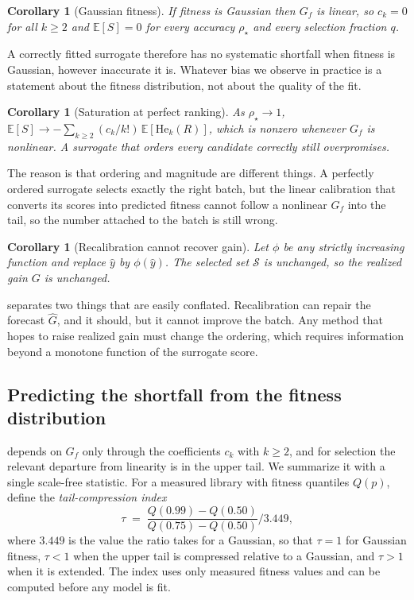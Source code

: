 \documentclass{article}
\theoremstyle{plain}
\newtheorem{corollary}[theorem]{Corollary}
\theoremstyle{definition}
\newcommand{\yhat}{\hat{y}}
\newcommand{\Exp}{\mathbb{E}}
\newcommand{\He}{\mathrm{He}}
\begin{document}
\begin{corollary}[Gaussian fitness]
\label{cor:gaussian}
If fitness is Gaussian then $G_{\!f}$ is linear, so $c_k = 0$ for all $k \ge 2$ and
$\Exp[S] = 0$ for every accuracy $\rho_\star$ and every selection fraction $q$.
\end{corollary}

A correctly fitted surrogate therefore has no systematic shortfall when fitness is
Gaussian, however inaccurate it is. Whatever bias we observe in practice is a statement
about the fitness distribution, not about the quality of the fit.

\begin{corollary}[Saturation at perfect ranking]
\label{cor:saturation}
As $\rho_\star \to 1$,
$\Exp[S] \to -\sum_{k \ge 2} (c_k/k!)\,\Exp[\He_k(R)]$,
which is nonzero whenever $G_{\!f}$ is nonlinear. A surrogate that orders every
candidate correctly still overpromises.
\end{corollary}

The reason is that ordering and magnitude are different things. A perfectly ordered
surrogate selects exactly the right batch, but the linear calibration that converts its
scores into predicted fitness cannot follow a nonlinear $G_{\!f}$ into the tail, so the
number attached to the batch is still wrong.

\begin{corollary}[Recalibration cannot recover gain]
\label{cor:monotone}
Let $\phi$ be any strictly increasing function and replace $\yhat$ by $\phi(\yhat)$.
The selected set $\mathcal{S}$ is unchanged, so the realized gain $G$ is unchanged.
\end{corollary}

 separates two things that are easily conflated. Recalibration can
repair the forecast $\hat{G}$, and it should, but it cannot improve the batch. Any
method that hopes to raise realized gain must change the ordering, which requires
information beyond a monotone function of the surrogate score.

\subsection{Predicting the shortfall from the fitness distribution}
\label{sec:tau}

 depends on $G_{\!f}$ only through the coefficients $c_k$ with $k \ge 2$,
and for selection the relevant departure from linearity is in the upper tail. We
summarize it with a single scale-free statistic. For a measured library with fitness
quantiles $Q(p)$, define the \emph{tail-compression index}
\begin{equation}
\tau \;=\; \frac{Q(0.99)-Q(0.50)}{Q(0.75)-Q(0.50)} \Big/ 3.449,
\label{eq:tau}
\end{equation}
where $3.449$ is the value the ratio takes for a Gaussian, so that $\tau = 1$ for
Gaussian fitness, $\tau < 1$ when the upper tail is compressed relative to a Gaussian,
and $\tau > 1$ when it is extended. The index uses only measured fitness values and can
be computed before any model is fit.
\end{document}
